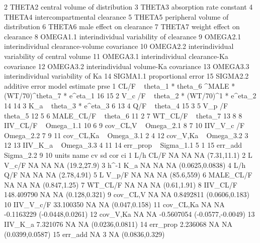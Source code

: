 \begin{Schunk}
\begin{Soutput}
2     THETA2                central volume of distribution
3     THETA3                      absorption rate constant
4     THETA4                  intercompartmental clearance
5     THETA5             peripheral volume of distribution
6     THETA6                      male effect on clearance
7     THETA7                    weight effect on clearance
8   OMEGA1.1      interindividual variability of clearance
9   OMEGA2.1   interindividual clearance-volume covariance
10  OMEGA2.2 interindividual variability of central volume
11  OMEGA3.1       interindividual clearance-Ka covariance
12  OMEGA3.2          interindividual volume-Ka covariance
13  OMEGA3.3             interindividual variability of Ka
14  SIGMA1.1                            proportional error
15  SIGMA2.2                                additive error
                                                           model estimate prse
1  CL/F  ~ theta_1 *  theta_6 ^MALE * (WT/70)^theta_7  * e^eta_1       16   15
2                        V_c /F  ~ theta_2 * (WT/70)^1 * e^eta_2       14   14
3                                       K_a  ~ theta_3 * e^eta_3        6   13
4                                                 Q/F  ~ theta_4       15    3
5                                              V_p /F  ~ theta_5       12    5
6                                            MALE_CL/F ~ theta_6       11    2
7                                              WT_CL/F ~ theta_7       13    8
8                                           IIV_CL/F ~ Omega_1.1       10    6
9                                           cov_CL,V ~ Omega_2.1        8    7
10                                        IIV_V_c /F ~ Omega_2.2        7    9
11                                        cov_CL,Ka  ~ Omega_3.1        2    4
12                                         cov_V,Ka  ~ Omega_3.2        3   12
13                                          IIV_K_a  ~ Omega_3.3        4   11
14                                          err_prop ~ Sigma_1.1        5    1
15                                           err_add ~ Sigma_2.2        9   10
   units      name         cv sd        cor                ci
1    L/h      CL/F         NA NA         NA       (7.31,11.1)
2      L     V_c/F         NA NA         NA       (19.2,27.9)
3  h^-1        K_a         NA NA         NA   (0.0625,0.0838)
4    L/h       Q/F         NA NA         NA       (2.78,4.91)
5      L     V_p/F         NA NA         NA        (85.6,559)
6        MALE_CL/F         NA NA         NA      (0.847,1.25)
7          WT_CL/F         NA NA         NA       (0.61,1.91)
8         IIV_CL/F 148.409790 NA         NA     (0.128,0.321)
9         cov_CL,V         NA NA  0.8492811    (0.0606,0.183)
10       IIV_V_c/F  33.100350 NA         NA     (0.047,0.158)
11       cov_CL,Ka         NA NA -0.1163229  (-0.0448,0.0261)
12        cov_V,Ka         NA NA -0.5607054 (-0.0577,-0.0049)
13         IIV_K_a   7.321076 NA         NA   (0.0236,0.0811)
14        err_prop   2.236068 NA         NA   (0.0399,0.0587)
15         err_add         NA  3         NA    (0.0836,0.329)
\end{Soutput}
\end{Schunk}
